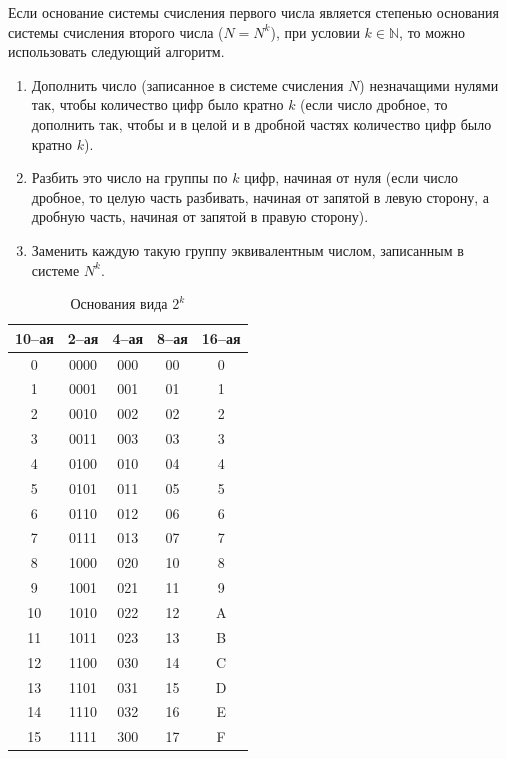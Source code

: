 Если основание системы счисления первого числа является степенью основания системы счисления второго числа ($N = N^{k}$), при условии $k \in \mathbb{N}$, то можно использовать следующий алгоритм.
\begin{center}
\end{center}

\begin{enumerate}
\item Дополнить число (записанное в системе счисления $N$) незначащими нулями так, чтобы количество цифр было кратно $k$ (если число дробное, то дополнить так, чтобы и в целой и в дробной частях количество цифр было кратно $k$).
\item Разбить это число на группы по $k$ цифр, начиная от нуля (если число дробное, то целую часть разбивать, начиная от запятой в левую сторону, а дробную часть, начиная от запятой в правую сторону).
\item Заменить каждую такую группу эквивалентным числом, записанным в системе $N^{k}$.
\end{enumerate}

\begin{center}
\end{center}
\begin{table}[h!]
\caption{Основания вида $2^{k}$}
\centering
\begin{tabular}{|c|c|c|c|c|}
\hline
10--ая & 2--ая & 4--ая & 8--ая & 16--ая
\\\hline
0 & 0000 & 000 & 00 & 0
\\ 1 & 0001& 001 & 01 & 1
\\ 2 & 0010 & 002 & 02 & 2
\\ 3 & 0011 &003 & 03 & 3
\\ 4 & 0100 & 010 & 04 & 4
\\ 5 & 0101 & 011 & 05 & 5
\\ 6 & 0110 & 012 & 06 & 6
\\ 7 & 0111 & 013 & 07 & 7
\\ 8 & 1000 & 020 & 10 & 8
\\ 9 & 1001 & 021 & 11 & 9
\\ 10 & 1010 & 022 & 12 & A
\\ 11 & 1011 & 023 & 13 & B
\\ 12 & 1100 & 030 & 14 & C
\\ 13 & 1101 & 031 & 15 & D
\\ 14 & 1110 & 032 & 16 & E
\\ 15 & 1111 &300 & 17 & F
\\\hline
\end{tabular}
\end{table}

